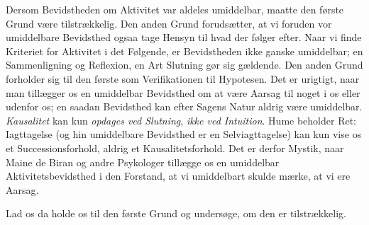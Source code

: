 \documentclass[12pt,a4paper,openany]{book}
\newcommand{\opage}[1]{\marginnote{\footnotesize\textit{[#1]}}}
\begin{document}
Dersom Bevidstheden om Aktivitet var aldeles umiddelbar, maatte den første
Grund være tilstrækkelig. Den anden Grund forudsætter, at vi foruden vor
umiddelbare Bevidsthed ogsaa tage Hensyn til hvad der følger efter. Naar vi
finde Kriteriet for Aktivitet i det Følgende, er Bevidstheden ikke ganske
umiddelbar; en Sammenligning og Reflexion, en Art Slutning gør sig gældende.
Den anden Grund forholder sig til den første som Verifikationen til Hypotesen.
Det er urigtigt, naar man tillægger os en umiddelbar Bevidsthed om at være
Aarsag til noget i os eller udenfor os; en saadan Bevidsthed kan efter Sagens
Natur aldrig være umiddelbar. \emph{Kausalitet} kan kun \emph{opdages ved
Slutning}, \emph{ikke ved Intuition}. Hume beholder Ret: Iagttagelse (og hin
umiddelbare Bevidsthed er en Selviagttagelse) kan kun vise os et
Successionsforhold, aldrig et Kausalitetsforhold. Det er derfor Mystik, naar
Maine de Biran og andre Psykologer tillægge os en umiddelbar
Aktivitetsbevidsthed i den Forstand, at vi umiddelbart skulde mærke, at vi ere
Aarsag.

\setcounter{footnote}{0}%
\opage{74}Lad os da holde os til den første Grund og undersøge, om den er
tilstrækkelig.
\end{document}
